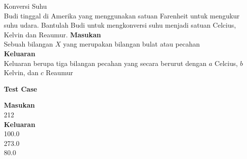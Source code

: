 \begin{permasalahan}{Konversi Suhu}\\
\label{prob:KonversiSuhu}
	Budi tinggal di Amerika yang menggunakan satuan  Farenheit untuk mengukur suhu udara. Bantulah Budi untuk mengkonversi suhu menjadi satuan Celcius, Kelvin dan Reaumur. 
	\textbf{Masukan}\\
	Sebuah bilangan $X$ yang merupakan bilangan bulat atau pecahan\\
	\textbf{Keluaran}\\
	Keluaran berupa tiga bilangan pecahan yang secara berurut dengan $a$ Celcius, $b$ Kelvin, dan $c$ Reaumur
 	\begin{center}
	\textbf{Test Case}\\
	\end{center}
	\textbf{Masukan}\\
	212\\
	\textbf{Keluaran}\\
	100.0\\
	273.0\\
	80.0	
\end{permasalahan}


